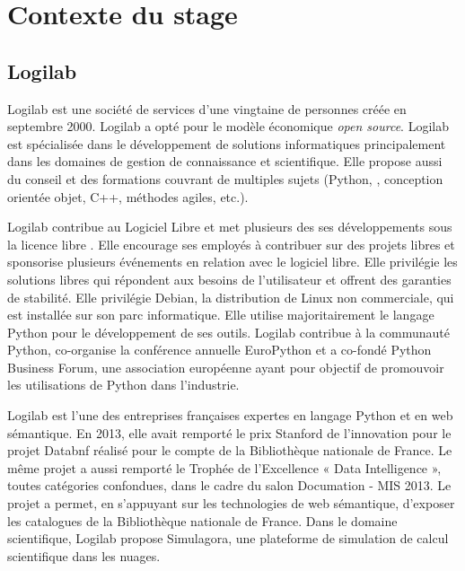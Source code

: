 
\chapter{Contexte du stage}
\section{Logilab}
Logilab est une société de services d'une vingtaine de personnes créée en septembre 2000. Logilab a opté pour le modèle économique \textit{open source}. Logilab est spécialisée dans le développement de solutions informatiques principalement dans les domaines de gestion de connaissance et scientifique. Elle propose aussi du conseil et des formations couvrant de multiples sujets (Python, , conception orientée objet, C++, méthodes agiles, etc.).

Logilab contribue au Logiciel Libre et met plusieurs des ses développements sous la licence libre . Elle encourage ses employés à contribuer sur des projets libres et sponsorise plusieurs événements en relation avec le logiciel libre. Elle privilégie les solutions libres qui répondent aux besoins de l'utilisateur et offrent des garanties de stabilité. Elle privilégie Debian, la distribution de Linux non commerciale, qui est installée sur son parc informatique. Elle utilise majoritairement le langage Python pour le développement de ses outils. Logilab contribue à la communauté Python, co-organise la conférence annuelle EuroPython et a co-fondé Python Business Forum, une association européenne ayant pour objectif de promouvoir les utilisations de Python dans l'industrie.

Logilab est l'une des entreprises françaises expertes en langage Python et en web sémantique. En 2013, elle avait remporté le prix Stanford de l'innovation pour le projet Databnf réalisé pour le compte de la Bibliothèque nationale de France. Le même projet a aussi remporté le Trophée de l'Excellence « Data Intelligence », toutes catégories confondues, dans le cadre du salon Documation - MIS 2013\cite{dta}. Le projet a permet, en s’appuyant sur les technologies de web sémantique, d'exposer les catalogues de la Bibliothèque nationale de France. Dans le domaine scientifique, Logilab propose Simulagora, une plateforme de simulation de calcul scientifique dans les nuages.

